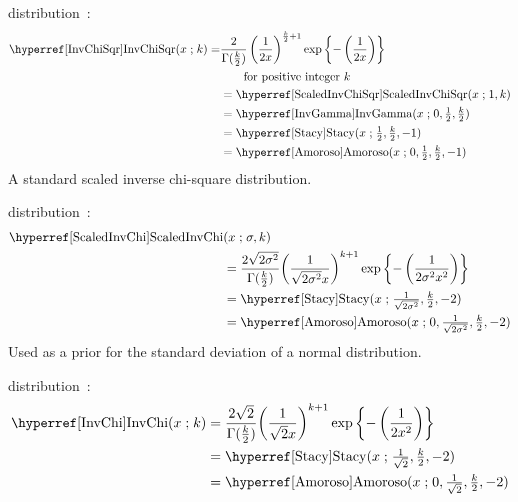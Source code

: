  distribution~\cite{Gelman2004}: 
%
\begin{align}
\label{InvChiSqr}
\opr{InvChiSqr}(x \given k) 
=& \frac{2}{\Gamma(\tfrac{k}{2}) } \left(\frac{1}{2x}\right)^{\frac{k}{2}+1} \exp\left\{-\left( \frac{1}{2x}  \right)\right\}
\checked  \\
&\qquad  \text{for positive integer } k \notag \\
& = \opr{ScaledInvChiSqr}(x\given 1,k)\notag \checked \\
&=  \opr{InvGamma}(x\given 0, \tfrac{1}{2}, \tfrac{k}{2}) \notag \checked \\
&=  \opr{Stacy}(x\given \tfrac{1}{2}, \tfrac{k}{2},-1) \notag  \checked\\
&=  \opr{Amoroso}(x\given  0, \tfrac{1}{2}, \tfrac{k}{2}, -1)  \checked\notag 
\end{align}
A standard scaled inverse chi-square distribution.



 distribution~\cite{Lee2012}:
\begin{align}
\label{ScaledInvChi}
 \opr{ScaledInvChi}&(x \given \sigma, k) 
\\ \notag
&= \frac{2 \sqrt{2 \sigma ^2} }{ \Gamma(\tfrac{k}{2})} { \left(\frac{1}{\sqrt{2 \sigma^2} x}\right)}^{k+1} \exp\left\{-\left(\frac{1}{2 \sigma^2 x^2}  \right)\right\} \checked
\\
&=  \opr{Stacy}(x\given \tfrac{1}{\sqrt{2 \sigma^2}}, \tfrac{k}{2}, -2)  \notag \checked \\
&=  \opr{Amoroso}(x\given  0, \tfrac{1}{\sqrt{2 \sigma^2}}, \tfrac{k}{2}, -2) \notag  \checked
\end{align}
Used as a prior for the standard deviation of a normal distribution.

 distribution~\cite{Lee2012}: 
\begin{align}
\label{InvChi}
\opr{InvChi}(x \given k) 
&= \frac{2\sqrt{2} }{ \Gamma(\tfrac{k}{2})} { \left(\frac{1}{\sqrt{2} x}\right)}^{k+1} \exp\left\{-\left(\frac{1}{2 x^2}  \right)\right\}
\checked
\\
&=  \opr{Stacy}(x\given  \tfrac{1}{\sqrt{2}}, \tfrac{k}{2}, -2)  \notag \checked \\
&=  \opr{Amoroso}(x\given  0, \tfrac{1}{\sqrt{2}} , \tfrac{k}{2}, -2) \notag  \checked
\end{align}



